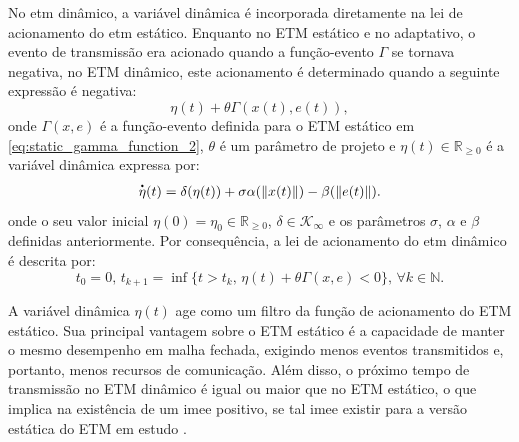 No \acrshort{etm} dinâmico, a variável dinâmica é incorporada diretamente na lei de acionamento do \acrshort{etm} estático. Enquanto no ETM estático e no adaptativo, o evento de transmissão era acionado quando a função-evento $\Gamma$ se tornava negativa, no ETM dinâmico, este acionamento é determinado quando a seguinte expressão é negativa: \begin{equation}
  \eta(t) + \theta\Gamma(x(t), e(t)),
\end{equation} onde $\Gamma(x, e)$ é a função-evento definida para o ETM estático em \eqref{eq:static_gamma_function_2}, $\theta$ é um parâmetro de projeto e $\eta(t) \in \mathbb{R}_{\geq 0}$ é a variável dinâmica expressa por: \begin{equation}
  \dt{\eta}(t) = \delta(\eta(t)) + \sigma \alpha(\|x(t)\|) - \beta(\|e(t)\|).
  \label{eq:dynamic_etm_dot_eta}
\end{equation} onde o seu valor inicial $\eta(0) = \eta_0 \in \mathbb{R}_{\geq 0}$, $\delta \in \mathcal{K}_\infty$ e os parâmetros $\sigma$, $\alpha$ e $\beta$ definidas anteriormente. Por consequência, a lei de acionamento do \acrshort{etm} dinâmico é descrita por: \begin{equation}
  t_0 = 0, \, t_{k+1} = \inf\{t > t_k, \, \eta(t) + \theta \Gamma(x, e) < 0\}, \, \forall k \in \mathbb{N}. \label{eq:dynamic_event_triggering_law}
\end{equation}

A variável dinâmica $\eta(t)$ age como um filtro da função de acionamento do ETM estático. Sua principal vantagem sobre o ETM estático é a capacidade de manter o mesmo desempenho em malha fechada, exigindo menos eventos transmitidos e, portanto, menos recursos de comunicação. Além disso, o próximo tempo de transmissão no ETM dinâmico é igual ou maior que no ETM estático, o que implica na existência de um \acrshort{imee} positivo, se tal \acrshort{imee} existir para a versão estática do ETM em estudo \citep{coutinho2021}.

